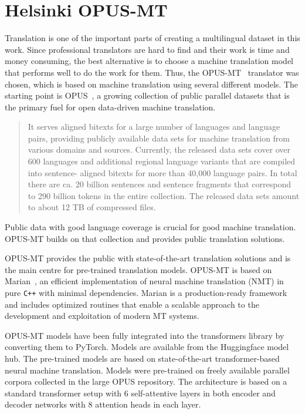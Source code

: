 \section{Helsinki OPUS-MT}
Translation is one of the important parts of creating a multilingual dataset in this work. Since professional translators are hard to find and their work is time and money consuming, the best alternative is to choose a machine translation model that performs well to do the work for them. Thus, the OPUS-MT~\cite{helsinki} translator was chosen, which is based on machine translation using several different models. The starting point is OPUS~\cite{opus-mt}, a growing collection of public parallel datasets that is the primary fuel for open data-driven machine translation.
\begin{quotation}
    It serves aligned bitexts for a large number of languages and language pairs, providing publicly available data sets for machine translation from various domains and sources. Currently, the released data sets cover over 600 languages and additional regional language variants that are compiled into sentence- aligned bitexts for more than 40,000 language pairs. In total there are ca. 20 billion sentences and sentence fragments that correspond to 290 billion tokens in the entire collection. The released data sets amount to about 12 TB of compressed files.~\cite{opus-mt}
\end{quotation}
Public data with good language coverage is crucial for good machine translation. OPUS-MT builds on that collection and provides public translation solutions.

OPUS-MT provides the public with state-of-the-art translation solutions and is the main centre for pre-trained translation models. OPUS-MT is based on Marian~\cite{marian}, an efficient implementation of neural machine translation (NMT) in pure \texttt{C++} with minimal dependencies. Marian is a production-ready framework and includes optimized routines that enable a scalable approach to the development and exploitation of modern MT systems.

OPUS-MT models have been fully integrated into the transformers library by converting them to PyTorch. Models are available from the Huggingface model hub. The pre-trained models are based on state-of-the-art transformer-based neural machine translation. Models were pre-trained on freely available parallel corpora collected in the large OPUS repository. The architecture is based on a standard transformer setup with 6 self-attentive layers in both encoder and decoder networks with 8 attention heads in each layer.

